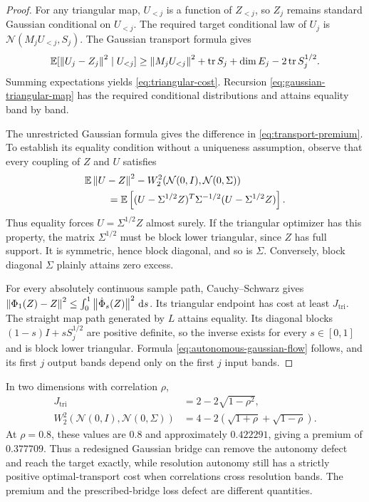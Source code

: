 \begin{proof}
For any triangular map, $U_{<j}$ is a function of $Z_{<j}$, so $Z_j$ remains standard Gaussian conditional on $U_{<j}$. The required target conditional law of $U_j$ is $\mathcal N(M_jU_{<j},S_j)$. The Gaussian transport formula gives
\[
 \mathbb E[\left\lVert U_j-Z_j\right\rVert^2\mid U_{<j}]
 \ge\left\lVert M_jU_{<j}\right\rVert^2+\operatorname{tr} S_j+\dim E_j-2\operatorname{tr} S_j^{1/2}.
\]
Summing expectations yields \eqref{eq:triangular-cost}. Recursion \eqref{eq:gaussian-triangular-map} has the required conditional distributions and attains equality band by band.

The unrestricted Gaussian formula gives the difference in \eqref{eq:transport-premium}. To establish its equality condition without a uniqueness assumption, observe that every coupling of $Z$ and $U$ satisfies
\begin{align}
 &\mathbb E\left\lVert U-Z\right\rVert^2-
   W_2^2(\mathcal N(0,I),\mathcal N(0,\Sigma))\notag\\
 &\hspace{8mm}=\mathbb E\left[(U-\Sigma^{1/2}Z)^T\Sigma^{-1/2}
                              (U-\Sigma^{1/2}Z)\right].
\end{align}
Thus equality forces $U=\Sigma^{1/2}Z$ almost surely. If the triangular optimizer has this property, the matrix $\Sigma^{1/2}$ must be block lower triangular, since $Z$ has full support. It is symmetric, hence block diagonal, and so is $\Sigma$. Conversely, block diagonal $\Sigma$ plainly attains zero excess.

For every absolutely continuous sample path, Cauchy--Schwarz gives
$\left\lVert\Phi_1(Z)-Z\right\rVert^2\le\int_0^1\left\lVert\dot\Phi_s(Z)\right\rVert^2\,\mathrm d s$.
Its triangular endpoint has cost at least $J_{\mathrm{tri}}$. The straight map path generated by $L$ attains equality. Its diagonal blocks $(1-s)I+sS_j^{1/2}$ are positive definite, so the inverse exists for every $s\in[0,1]$ and is block lower triangular. Formula \eqref{eq:autonomous-gaussian-flow} follows, and its first $j$ output bands depend only on the first $j$ input bands.
\end{proof}

In two dimensions with correlation $\rho$,
\begin{align}
 J_{\mathrm{tri}}&=2-2\sqrt{1-\rho^2},\\
 W_2^2(\mathcal N(0,I),\mathcal N(0,\Sigma))
 &=4-2\left(\sqrt{1+\rho}+\sqrt{1-\rho}\right).
\end{align}
At $\rho=0.8$, these values are $0.8$ and approximately $0.422291$, giving a premium of $0.377709$. Thus a redesigned Gaussian bridge can remove the autonomy defect and reach the target exactly, while resolution autonomy still has a strictly positive optimal-transport cost when correlations cross resolution bands. The premium and the prescribed-bridge loss defect are different quantities.
